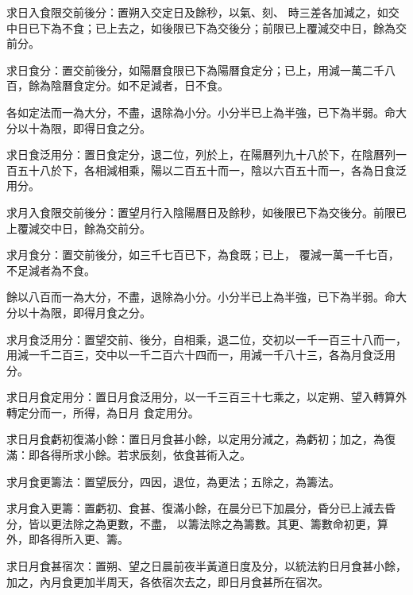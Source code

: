 \begin{pinyinscope}
 求日入食限交前後分：置朔入交定日及餘秒，以氣、刻、
 時三差各加減之，如交中日已下為不食；已上去之，如後限已下為交後分；前限已上覆減交中日，餘為交前分。



 求日食分：置交前後分，如陽曆食限已下為陽曆食定分；已上，用減一萬二千八百，餘為陰曆食定分。如不足減者，日不食。



 各如定法而一為大分，不盡，退除為小分。小分半已上為半強，已下為半弱。命大分以十為限，即得日食之分。



 求日食泛用分：置日食定分，退二位，列於上，在陽曆列九十八於下，在陰曆列一百五十八於下，各相減相乘，陽以二百五十而一，陰以六百五十而一，各為日食泛用分。



 求月入食限交前後分：置望月行入陰陽曆日及餘秒，如後限已下為交後分。前限已上覆減交中日，餘為交前分。



 求月食分：置交前後分，如三千七百已下，為食既；已上，
 覆減一萬一千七百，不足減者為不食。



 餘以八百而一為大分，不盡，退除為小分。小分半已上為半強，已下為半弱。命大分以十為限，即得月食之分。



 求月食泛用分：置望交前、後分，自相乘，退二位，交初以一千一百三十八而一，用減一千二百三，交中以一千二百六十四而一，用減一千八十三，各為月食泛用分。



 求日月食定用分：置日月食泛用分，以一千三百三十七乘之，以定朔、望入轉算外轉定分而一，所得，為日月
 食定用分。



 求日月食虧初復滿小餘：置日月食甚小餘，以定用分減之，為虧初；加之，為復滿：即各得所求小餘。若求辰刻，依食甚術入之。



 求月食更籌法：置望辰分，四因，退位，為更法；五除之，為籌法。



 求月食入更籌：置虧初、食甚、復滿小餘，在晨分已下加晨分，昏分已上減去昏分，皆以更法除之為更數，不盡，
 以籌法除之為籌數。其更、籌數命初更，算外，即各得所入更、籌。



 求日月食甚宿次：置朔、望之日晨前夜半黃道日度及分，以統法約日月食甚小餘，加之，內月食更加半周天，各依宿次去之，即日月食甚所在宿次。




\end{pinyinscope}
